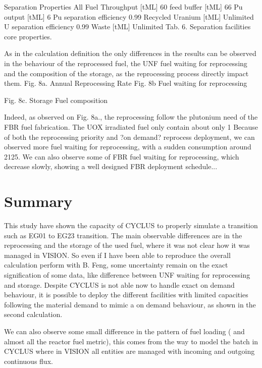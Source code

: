\documentclass[12pt]{article}
\begin{document}
Separation Properties
All Fuel 
Throughput [tML]
60
feed buffer [tML]
66
Pu output  [tML]
6
Pu separation efficiency
0.99
Recycled Uranium [tML]
Unlimited
U separation efficiency
0.99
Waste [tML]
Unlimited
Tab. 6. Separation facilities core properties.


As in the calculation definition the only differences in the results can be observed in the behaviour of the reprocessed fuel, the UNF fuel waiting for reprocessing and the composition of the storage, as the reprocessing process directly impact them.
Fig. 8a. Annual Reprocessing Rate				Fig. 8b Fuel waiting for reprocessing

Fig. 8c. Storage Fuel composition

Indeed, as observed on Fig. 8a., the reprocessing follow the plutonium need of the FBR fuel fabrication. The UOX irradiated fuel only contain about only 1 %
Because of both the reprocessing priority and ?on demand? reprocess deployment, we can observed more fuel waiting for reprocessing, with a sudden consumption around 2125. We can also observe some of FBR fuel waiting for reprocessing, which decrease slowly, showing a well designed FBR deployment schedule...
\section{Summary}
This study have shown the capacity of CYCLUS to properly simulate a transition such as EG01 to EG23 transition.
The main observable differences are in the reprocessing and the storage of the used fuel, where it was not clear how it was managed in VISION. So even if I have been able to reproduce the overall calculation perform with B. Feng, some uncertainty remain on the exact signification of some data, like difference between UNF waiting for reprocessing and storage.
Despite CYCLUS is not able now to handle exact on demand behaviour, it is possible to deploy the different facilities with limited capacities following the material demand to mimic a on demand behaviour, as shown in the second calculation.

We can also observe some small difference in the pattern of fuel loading ( and almost all the reactor fuel metric), this comes from the way to model the batch in CYCLUS where in VISION all entities are managed with incoming and outgoing continuous flux.








\end{document}
